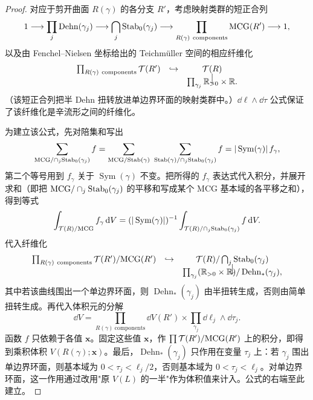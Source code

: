 
\begin{proof}
对应于剪开曲面 $R(\gamma)$ 的各分支 $R'$，考虑映射类群的短正合列
\[
1\longrightarrow\prod_j\operatorname{Dehn}(\gamma_j)\longrightarrow\bigcap_j\Stab_0(\gamma_j)
\longrightarrow\prod_{R(\gamma)\ \text{components}}\MCG(R')\longrightarrow1,
\]
以及由 Fenchel--Nielsen 坐标给出的 Teichmüller 空间的相应纤维化
\[
\begin{array}{ccc}
\prod_{R(\gamma)\ \text{components}}\mathcal{T}(R') & \hookrightarrow & \mathcal{T}(R)\\[-2pt]
& & \big\downarrow\\[-8pt]
& & \prod_{\gamma_j}\mathbb{R}_{>0}\times\mathbb{R}.
\end{array}
\]
（该短正合列把半 Dehn 扭转放进单边界环面的映射类群中。）$\dd\ell\wedge\dd\tau$ 公式保证了该纤维化是辛流形之间的纤维化。

为建立该公式，先对陪集和写出
\[
\sum_{\MCG/\cap_j\Stab_0(\gamma_j)}f=\sum_{\MCG/\Stab(\gamma)}\ \sum_{\Stab(\gamma)/\cap_j\Stab_0(\gamma_j)}f
=|\operatorname{Sym}(\gamma)|\,f_\gamma,
\]
第二个等号用到 $f_\gamma$ 关于 $\operatorname{Sym}(\gamma)$ 不变。把所得的 $f_\gamma$ 表达式代入积分，并展开求和（即把 $\mathrm{MCG}/\cap_j\mathrm{Stab}_0(\gamma_j)$ 的平移和写成某个 MCG 基本域的各平移之和），得到等式
\[
\int_{\mathcal{T}(R)/\mathrm{MCG}}f_\gamma\,\mathrm{d} V
=(|\operatorname{Sym}(\gamma)|)^{-1}\int_{\mathcal{T}(R)/\cap_j\mathrm{Stab}_0(\gamma_j)}f\,\mathrm{d} V.
\]
代入纤维化
\[
\begin{array}{ccc}
\prod_{R(\gamma)\ \text{components}}\mathcal{T}(R')/\mathrm{MCG}(R') & \hookrightarrow & \mathcal{T}(R)/\bigcap_j\mathrm{Stab}_0(\gamma_j)\\[-2pt]
& & \big\downarrow\\[-8pt]
& & \prod_{\gamma_j}(\mathbb{R}_{>0}\times\mathbb{R})/\operatorname{Dehn}_*(\gamma_j),
\end{array}
\]
其中若该曲线围出一个单边界环面，则 $\operatorname{Dehn}_*(\gamma_j)$ 由半扭转生成，否则由简单扭转生成。再代入体积元的分解
\[
\dd V=\prod_{R(\gamma)\ \text{components}}\dd V(R')\times\prod_{\gamma_j}\dd\ell_j\wedge\dd\tau_j.
\]
函数 $f$ 只依赖于各值 $\mathbf{x}$。固定这些值 $\mathbf{x}$，作 $\prod\mathcal{T}(R')/\mathrm{MCG}(R')$ 上的积分，即得到乘积体积 $V(R(\gamma);\mathbf{x})$。最后，$\operatorname{Dehn}_*(\gamma_j)$ 只作用在变量 $\tau_j$ 上：若 $\gamma_j$ 围出单边界环面，则基本域为 $0<\tau_j<\ell_j/2$，否则基本域为 $0<\tau_j<\ell_j$。对单边界环面，这一作用通过改用"原 $V(L)$ 的一半"作为体积值来计入。公式的右端至此建立。
\end{proof}

